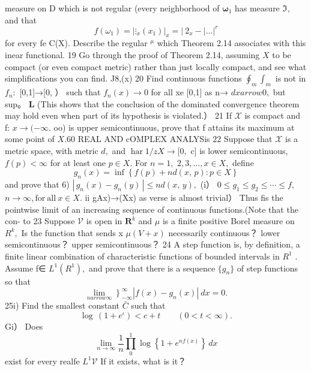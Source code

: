 measure on D which is not regular (every neighborhood of ${\boldsymbol{\omega}}_{1}$ has measure ${\mathfrak{I}}_{}^{},$ and that $$ f(\omega_{1})=\left|\vdots_{x}(x_{1})\right|_{x}=\left|\ 2_{x}- |\ldots\right|^{r} $$ for every fe C(X). Describe the regular ${}^{\mu}$ which Theorem 2.14 associates with this inear functional. 19 Go through the proof of Theorem 2.14, assuming $\scriptstyle{X}$ to be compact (or even compact metric) rather than just locally compact, and see what simplifications you can find. J8,(x) 20 Find continuous functions $\oint_{m}\int_{m}$ is not in $f_{n}\colon$ [0,1]→[0, ） such that $f_{n}(x)\to0$ for all xe [0,1] as n→ $d x{ arrow}0,$ but sup。 $\boldsymbol{L}$ (This shows that the conclusion of the dominated convergence theorem may hold even when part of its hypothesis is violated.） 21 If $\scriptstyle{\mathcal{X}}$ is compact and f: $x\to(-\infty.$ oo) is upper semicontinuous, prove that f attains its maximum at some point of $X.$60 REAL AND cOMPLEX ANALYSis $22$ Suppose that $\scriptstyle{\mathcal{X}}$ is a metric space, with metric ${\mathit{d}},$ and $\operatorname{har}1/z X\to[0,$ c] is lower semicontinuous, $f(p)<\infty$ for at least one $p\in X.$ For $n=1,$ $2,3,\ldots,x\in X,$ define $$ g_{n}(x)=\operatorname*{inf}\left\{f(p)+n d(x,\,p)\colon p\in X\right\} $$ and prove that 6) $\left|\,g_{n}(x)-g_{n}(y)\,\right|\leq n d(x,\,y),$ (i） $0\leq g_{1}\leq g_{2}\leq\cdots\leq f,$ $n\to\infty,{\mathrm{for~all~}}x\in X.$ ii gAx)→(Xx) as verse is almost trivial） Thus fis the pointwise limit of an increasing sequence of continuous functions.(Note that the con- to 23 Suppose $\mathcal{V}$ is open in ${\boldsymbol{R}}^{k}$ and $\mu$ is a finite positive Borel measure on $R^{k},$ Is the function that sends x $\mu(V+x)$ necessarily continuous？ lower semicontinuous？ upper semicontinuous？ 24 A step function is, by definition, a finite linear combination of characteristic functions of bounded intervals in $R^{1}$ . Assume f∈ $L^{1}(R^{1}),$ and prove that there is a sequence $\{g_{n}\}$ of step functions so that $$ \operatorname*{lim}_{n arrow\infty}\left.\right\}_{-\infty}^{\infty}|f(x)-g_{n}(x)|\ d{x}=0. $$ 25i) Find the smallest constant $\bar{C}$ such that $$ \log\,(1+e^{\iota})<c+t\quad\quad(0<t<\infty). $$ Gi） Does $$ \operatorname*{lim}_{n\to\infty}{\frac{1}{n}}\prod_{0}^{1}\log\left\{1+e^{n f(x)}\right\}\,d x $$ exist for every realfe $L^{1}{\mathcal{V}}$ If it exists, what is it？